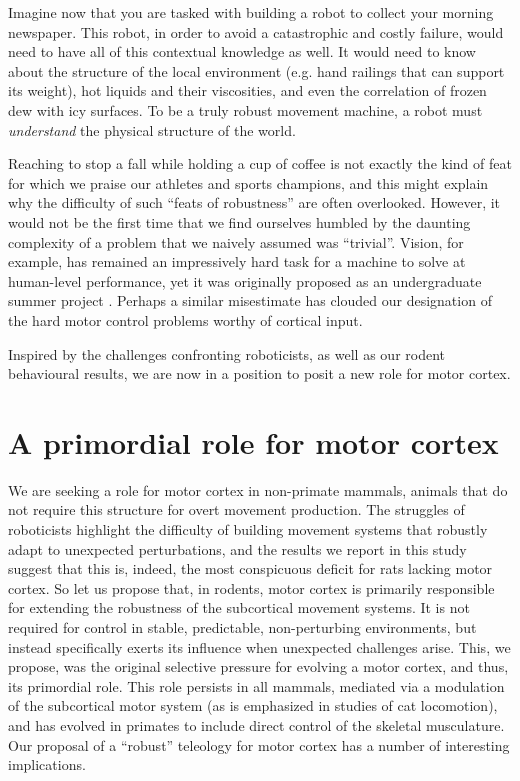 Imagine now that you are tasked with building a robot to collect your morning newspaper. This robot, in order to avoid a catastrophic and costly failure, would need to have all of this contextual knowledge as well. It would need to know about the structure of the local environment (e.g. hand railings that can support its weight), hot liquids and their viscosities, and even the correlation of frozen dew with icy surfaces. To be a truly robust movement machine, a robot must \emph{understand} the physical structure of the world.

Reaching to stop a fall while holding a cup of coffee is not exactly the kind of feat for which we praise our athletes and sports champions, and this might explain why the difficulty of such ``feats of robustness'' are often overlooked. However, it would not be the first time that we find ourselves humbled by the daunting complexity of a problem that we naively assumed was ``trivial''. Vision, for example, has remained an impressively hard task for a machine to solve at human-level performance, yet it was originally proposed as an undergraduate summer project \cite{Papert1966}. Perhaps a similar misestimate has clouded our designation of the hard motor control problems worthy of cortical input.

Inspired by the challenges confronting roboticists, as well as our rodent behavioural results, we are now in a position to posit a new role for motor cortex.

\section{A primordial role for motor cortex}

We are seeking a role for motor cortex in non-primate mammals, animals that do not require this structure for overt movement production. The struggles of roboticists highlight the difficulty of building movement systems that robustly adapt to unexpected perturbations, and the results we report in this study suggest that this is, indeed, the most conspicuous deficit for rats lacking motor cortex. So let us propose that, in rodents, motor cortex is primarily responsible for extending the robustness of the subcortical movement systems. It is not required for control in stable, predictable, non-perturbing environments, but instead specifically exerts its influence when unexpected challenges arise. This, we propose, was the original selective pressure for evolving a motor cortex, and thus, its primordial role. This role persists in all mammals, mediated via a modulation of the subcortical motor system (as is emphasized in studies of cat locomotion), and has evolved in primates to include direct control of the skeletal musculature. Our proposal of a ``robust'' teleology for motor cortex has a number of interesting implications.


